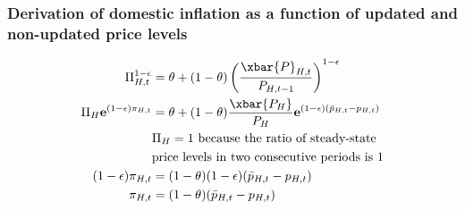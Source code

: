 \subsubsection{Derivation of domestic inflation as a function of updated and non-updated price levels}
\begin{align}\label{eq:appendix_domestic_inflation_new_price_start}
    \Pi_{H,t}^{1-\epsilon} &= \theta + (1-\theta)\left(\frac{\xbar{P}_{H,t}}{P_{H,t-1}}\right)^{1-\epsilon} \\
    \Pi_H \mathbf{e}^{(1-\epsilon)\pi_{H,t}} &= \theta + (1-\theta)\frac{\xbar{P_H}}{P_H}\mathbf{e}^{(1-\epsilon)(\bar{p}_{H,t} - p_{H,t})} \\
    &\text{$\Pi_H = 1$ because the ratio of steady-state}\nonumber \\
    &\text{price levels in two consecutive periods is 1} \nonumber\\
    (1-\epsilon)\pi_{H,t} &= (1-\theta)(1-\epsilon)(\bar{p}_{H,t} - p_{H,t}) \\
    \pi_{H,t} &= (1-\theta)(\bar{p}_{H,t} - p_{H,t})
    \label{eq:appendix_domestic_inflation_new_price_end}
\end{align}
\newpage